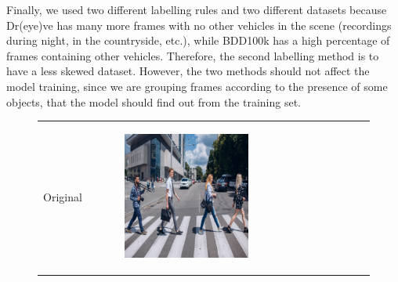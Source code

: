 Finally, we used two different labelling rules and two different datasets because 
Dr(eye)ve has many more frames with no other vehicles in the scene (recordings 
during night, in the countryside, etc.), while BDD100k has a high percentage of 
frames containing other vehicles. Therefore, the second labelling method is to 
have a less skewed dataset.
However, the two methods should not affect the model training, since we are 
grouping frames according to the presence of some objects, that the model should 
find out from the training set.
%
\newlength{\subfigwidth}
\setlength{\subfigwidth}{32mm}
\newlength{\horspace}
\setlength{\horspace}{.25\textwidth}
\begin{figure}
    \caption[Attention maps for a pre-trained multi-head ViT.]
    {Attention masks for a pre-trained multi-head ViT \cite{attention_vit}.}
    \centering
    \begin{tabular}{r p{\horspace} p{\horspace} p{\horspace}}
    Original & 
    \begin{subfigure}[b]{\subfigwidth}
        \includegraphics[width=\subfigwidth]{images/vit_attention/1/img.png}
    \end{subfigure}
    \hfill &
    \begin{subfigure}[b]{\subfigwidth}

\end{subfigure}
\end{tabular}
\end{figure}
